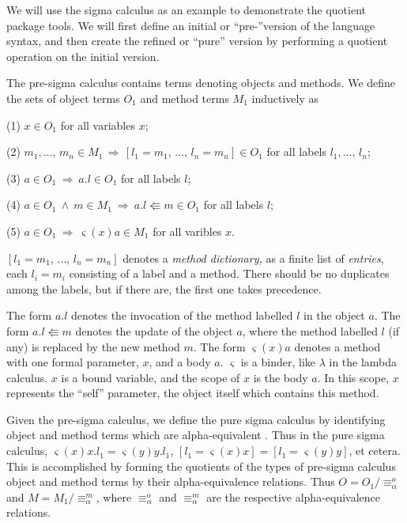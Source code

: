 \documentclass[envcountsame,runningheads]{llncs}
\begin{document}
We will use the sigma calculus as an example to demonstrate the quotient
package tools.
We will first define an initial or ``pre-''version of the
language syntax,
and then create the refined or ``pure'' version
by performing a quotient operation on the initial version.

The pre-sigma calculus contains terms denoting objects and methods.
We define the sets of object terms $O_1$ and method terms $M_1$ inductively as

(1) $x \in O_1$ for all variables $x$;

(2) $m_1, \ldots,\, m_n \in M_1 \,\Rightarrow\,
     [ l_1 \mathbin{=} m_1,\,\ldots,\,l_n \mathbin{=} m_n ] \in O_1$
     for all labels $l_1,\ldots,\,l_n$;

(3) $a \in O_1 \ \Rightarrow \ a.l \in O_1$ for all labels $l$;

(4) $a \in O_1 \ \wedge \ m \in M_1 \ \Rightarrow \
     a.l \Lleftarrow m \in O_1$ for all labels $l$;

(5) $a \in O_1 \ \Rightarrow \ \varsigma(x)a \in M_1$ for all varibles $x$.

$[ l_1 \mathbin{=} m_1, \,\ldots,\, l_n \mathbin{=} m_n ]$ denotes a
{\it method dictionary,}
as a finite list of {\it entries}, each $l_i \mathbin{=} m_i$
consisting of a label and a method.
There should be no duplicates among the labels, but if there are, the first
one takes precedence.

The form $a.l$ denotes the invocation of the method labelled $l$ in the
object $a$.  The form $a.l \Lleftarrow m$ denotes the update of the object
$a$, where the method labelled $l$ (if any) is replaced by the new
method $m$.  The form $\varsigma(x)a$ denotes a method with one formal
parameter, $x$, and a body $a$.  $\varsigma$ is a binder, like $\lambda$
in the lambda calculus.  $x$ is a bound variable,
and the scope of $x$ is the body $a$.
In this scope, $x$ represents the ``self'' parameter,
the object itself which contains this method.

Given the pre-sigma calculus, we define the pure sigma
calculus by identifying object and method terms which are alpha-equivalent
\cite{Bar81}.
Thus in the pure sigma calculus, $\varsigma(x)x.l_1 = \varsigma(y)y.l_1$,
$[l_1 \mathbin{=} \varsigma(x)x] = [l_1 \mathbin{=} \varsigma(y)y]$, et cetera.
This is accomplished
by forming the quotients of the types of pre-sigma calculus
object and method terms by their
alpha-equivalence relations.
Thus $O = O_1 / {\equiv}_{\alpha}^o$
and $M = M_1 / {\equiv}_{\alpha}^m$,
where ${\equiv}_{\alpha}^o$ and ${\equiv}_{\alpha}^m$ are the
respective alpha-equivalence relations.
\end{document}
